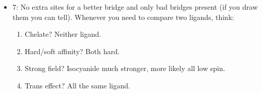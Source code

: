 \documentclass[../notes.tex]{subfiles}
\begin{document}
\begin{itemize}
\begin{itemize}
        \item 7: No extra sites for a better bridge and only bad bridges present (if you draw them you can tell). Whenever you need to compare two ligands, think:
        \begin{enumerate}
            \item Chelate? Neither ligand.
            \item Hard/soft affinity? Both hard.
            \item Strong field? Isocyanide much stronger, more likely all low spin.
            \item Trans effect? All the same ligand.
        \end{enumerate}
    \end{itemize}
\end{itemize}
\end{document}
